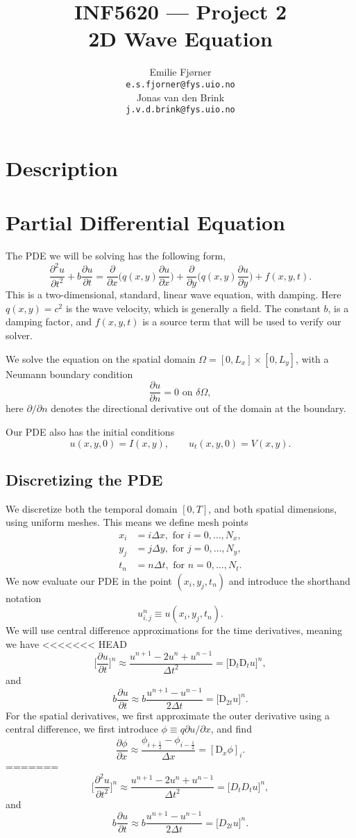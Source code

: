 \documentclass[a4paper, 11pt, notitlepage, english]{article}
\author{Emilie Fjørner \\[-0.4cm] \texttt{e.s.fjorner@fys.uio.no} \\[0.2cm] Jonas van den Brink \\[-0.4cm] \texttt{j.v.d.brink@fys.uio.no}}
\title{INF5620 --- Project 2 \\ 2D Wave Equation}
\newcommand{\p}{\partial}
\newcommand{\D}{\mbox{D}}
\begin{document}
\maketitle

\vspace{1cm}

\section*{Description}

\clearpage

\section*{Partial Differential Equation}

The PDE we will be solving has the following form,
$$\frac{\p^2 u}{\p t^2} + b\frac{\p u}{\p t} = \frac{\p}{\p x}\bigg(q(x,y) \frac{\p u}{\p x}\bigg) + \frac{\p}{\p y}\bigg(q(x,y)\frac{\p u}{\p y} \bigg) + f(x,y,t).$$
This is a two-dimensional, standard, linear wave equation, with damping. Here $q(x,y) = c^2$ is the wave velocity, which is generally a field. The constant $b$, is a damping factor, and $f(x,y,t)$ is a source term that will be used to verify our solver.

We solve the equation on the spatial domain $\Omega = [0,L_x] \times [0,L_y]$, with a Neumann boundary condition
$$\frac{\p u}{\p n} = 0 \mbox{ on } \delta\Omega,$$
here $\p/\p n$ denotes the directional derivative out of the domain at the boundary.

Our PDE also has the initial conditions
$$u(x,y,0) = I(x,y), \qquad u_t(x,y,0) = V(x,y).$$

\subsection*{Discretizing the PDE}
We discretize both the temporal domain $[0,T]$, and both spatial dimensions, using uniform meshes. This means we define mesh points
\begin{align*}
x_i &= i\Delta x, \mbox{ for } i=0,\ldots,N_x, \\
y_j &= j\Delta y, \mbox{ for } j=0,\ldots,N_y, \\
t_n &= n\Delta t, \mbox{ for } n=0,\ldots,N_t.
\end{align*}
We now evaluate our PDE in the point $(x_i, y_j, t_n)$ and introduce the shorthand notation
$$u_{i,j}^n \equiv u(x_i, y_j, t_n).$$
We will use central difference approximations for the time derivatives, meaning we have
<<<<<<< HEAD
$$\bigg[\frac{\p u}{\p t}\bigg]^n \approx \frac{u^{n+1} - 2u^n + u^{n-1}}{\Delta t^2} = \bigg[\D_t\D_t u\bigg]^n,$$
and
$$b\frac{\p u}{\p t} \approx b \frac{u^{n+1}-u^{n-1}}{2\Delta t} = \bigg[\D_{2t}u\bigg]^n.$$
For the spatial derivatives, we first approximate the outer derivative using a central difference, we first introduce $\phi \equiv q \p u/\p x$, and find
$$\frac{\p \phi}{\p x} \approx \frac{\phi_{i+\frac{1}{2}} - \phi_{i-\frac{1}{2}}}{\Delta x} = [\D_x \phi]_{i}.$$
=======
$$\bigg[\frac{\p^2 u}{\p t^2}\bigg]^n \approx \frac{u^{n+1} - 2u^n + u^{n-1}}{\Delta t^2} = \bigg[D_tD_t u\bigg]^n,$$
and
$$b\frac{\p u}{\p t} \approx b \frac{u^{n+1}-u^{n-1}}{2\Delta t} = \bigg[D_{2t}u\bigg]^n.$$
\end{document}
